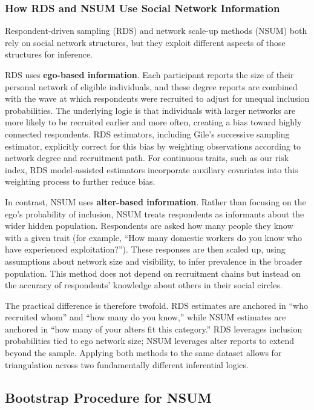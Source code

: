 \documentclass[
  12pt,
  letterpaper,
  DIV=11,
  numbers=noendperiod]{scrartcl}
\theoremstyle{plain}
\theoremstyle{definition}
\begin{document}
\subsubsection{How RDS and NSUM Use Social Network
Information}\label{how-rds-and-nsum-use-social-network-information}

Respondent-driven sampling (RDS) and network scale-up methods (NSUM)
both rely on social network structures, but they exploit different
aspects of those structures for inference.

RDS uses \textbf{ego-based information}. Each participant reports the
size of their personal network of eligible individuals, and these degree
reports are combined with the wave at which respondents were recruited
to adjust for unequal inclusion probabilities. The underlying logic is
that individuals with larger networks are more likely to be recruited
earlier and more often, creating a bias toward highly connected
respondents. RDS estimators, including Gile's successive sampling
estimator, explicitly correct for this bias by weighting observations
according to network degree and recruitment path. For continuous traits,
such as our risk index, RDS model-assisted estimators incorporate
auxiliary covariates into this weighting process to further reduce bias.

In contrast, NSUM uses \textbf{alter-based information}. Rather than
focusing on the ego's probability of inclusion, NSUM treats respondents
as informants about the wider hidden population. Respondents are asked
how many people they know with a given trait (for example, ``How many
domestic workers do you know who have experienced exploitation?'').
These responses are then scaled up, using assumptions about network size
and visibility, to infer prevalence in the broader population. This
method does not depend on recruitment chains but instead on the accuracy
of respondents' knowledge about others in their social circles.

The practical difference is therefore twofold. RDS estimates are
anchored in ``who recruited whom'' and ``how many do you know,'' while
NSUM estimates are anchored in ``how many of your alters fit this
category.'' RDS leverages inclusion probabilities tied to ego network
size; NSUM leverages alter reports to extend beyond the sample. Applying
both methods to the same dataset allows for triangulation across two
fundamentally different inferential logics.

\subsection{Bootstrap Procedure for
NSUM}\label{bootstrap-procedure-for-nsum}
\end{document}
